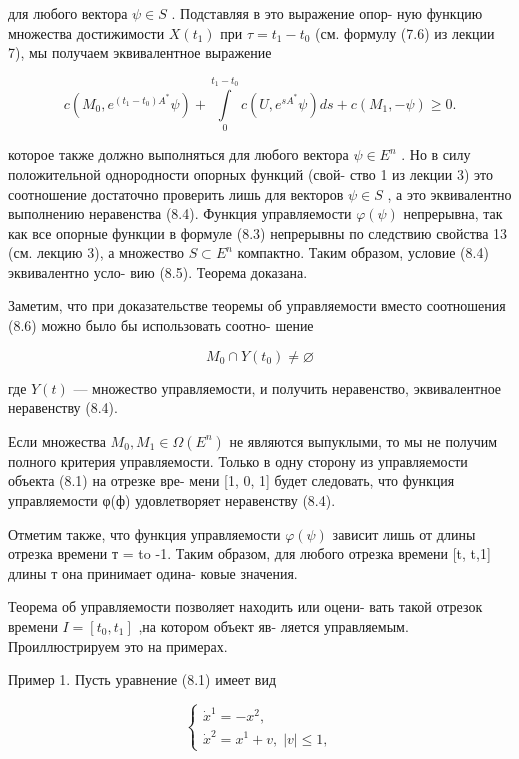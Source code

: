 \documentclass[8pt]{extarticle}
\begin{document}
для любого вектора \(\psi  \in  S\) . Подставляя в это выражение опор- ную функцию множества достижимости \(X\left( {t}_{1}\right)\) при \(\tau  = {t}_{1} - {t}_{0}\) (см. формулу (7.6) из лекции 7), мы получаем эквивалентное выражение

\[
c\left( {{M}_{0},{e}^{\left( {{t}_{1} - {t}_{0}}\right) {A}^{ * }}\psi }\right)  + \mathop{\int }\limits_{0}^{{{t}_{1} - {t}_{0}}}c\left( {U,{e}^{s{A}^{ * }}\psi }\right) {ds} + c\left( {{M}_{1}, - \psi }\right)  \geq  0.
\]

которое также должно выполняться для любого вектора \(\psi  \in  {E}^{n}\) . Но в силу положительной однородности опорных функций (свой- ство 1 из лекции 3) это соотношение достаточно проверить лишь для векторов \(\psi  \in  S\) , а это эквивалентно выполнению неравенства (8.4). Функция управляемости \(\varphi \left( \psi \right)\) непрерывна, так как все опорные функции в формуле (8.3) непрерывны по следствию свойства 13 (см. лекцию 3), а множество \(S \subset  {E}^{n}\) компактно. Таким образом, условие (8.4) эквивалентно усло- вию (8.5). Теорема доказана.

Заметим, что при доказательстве теоремы об управляемости вместо соотношения (8.6) можно было бы использовать соотно- шение

\[
{M}_{0} \cap  Y\left( {t}_{0}\right)  \neq  \varnothing
\]

где \(Y\left( t\right)\) — множество управляемости, и получить неравенство, эквивалентное неравенству (8.4).

Если множества \({M}_{0},{M}_{1} \in  \Omega \left( {E}^{n}\right)\) не являются выпуклыми, то мы не получим полного критерия управляемости. Только в одну сторону из управляемости объекта (8.1) на отрезке вре- мени [1, 0, 1] будет следовать, что функция управляемости φ(ф) удовлетворяет неравенству (8.4).

Отметим также, что функция управляемости \(\varphi \left( \psi \right)\) зависит лишь от длины отрезка времени т = to -1. Таким образом, для любого отрезка времени [t, t,1] длины т она принимает одина- ковые значения.

Теорема об управляемости позволяет находить или оцени- вать такой отрезок времени \(I = \left\lbrack  {{t}_{0},{t}_{1}}\right\rbrack\) ,на котором объект яв- ляется управляемым. Проиллюстрируем это на примерах.

Пример 1. Пусть уравнение (8.1) имеет вид

\[
\left\{  \begin{array}{l} {\dot{x}}^{1} =  - {x}^{2}, \\  {\dot{x}}^{2} = {x}^{1} + v,\;\left| v\right|  \leq  1, \end{array}\right. \tag{8.7}
\]
\end{document}
